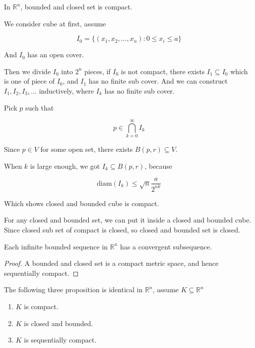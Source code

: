 \begin{thm}\label{heine-borel}
    In $\mathbb{R}^n$, bounded and closed set is compact. 

    We consider cube at first, assume 

    \[
        I_0 =  \{ (x_1,x_2,\dots, x_n):  0 \le x_i \le a\}
    \]

    And $I_0$ has an open cover.

    Then we divide $I_0$ into $2^n$ pieces, if $I_0$ is not compact, 
    there exists $I_1 \subseteq I_0$ which is one of piece of $I_0$, and 
    $I_1$ has no finite sub cover. And we can construct $I_1,I_2,I_3,\dots$ 
    inductively, where $I_k$ has no finite sub cover.

    Pick $p$ such that

    \[
        p \in \bigcap_{k=0}^{\infty}I_k
    \]

    Since $p \in V$ for some open set, there exists $B(p, r) \subseteq V$. 

    When $k$ is large enough, we got $I_k \subseteq B(p,r)$, because

    \[
        \mathrm{diam}(I_k) \le \sqrt{n} \frac{a}{2^{nk}}
    \]

    Which shows closed and bounded cube is compact.

    For any closed and bounded set, we can put it inside a closed and bounded cube.
    Since closed sub set of compact is closed, so closed and bounded set is closed.
\end{thm}


\begin{thm}\label{metric-space-bolzano-weierstrass}
    Each infinite bounded sequence in $\mathbb{R}^n$
 has a convergent subsequence. 
\end{thm}

\begin{proof}
    A bounded and closed set is a compact metric space, and hence sequentially compact.
\end{proof}

\begin{remark}
    The following three proposition is identical in $\mathbb{R}^n$, assume $K \subseteq \mathbb{R}^n$

    \begin{enumerate}
        \item $K$ is compact.
        \item $K$ is closed and bounded.
        \item $K$ is sequentially compact.
    \end{enumerate}
\end{remark}

